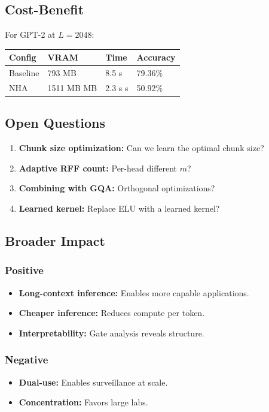 \subsection{Cost-Benefit}

For GPT-2 at $L = 2048$:

\begin{table}[H]
\centering
\small
\begin{tabular}{llll}
\toprule
\textbf{Config} & \textbf{VRAM} & \textbf{Time} & \textbf{Accuracy} \\
\midrule
Baseline & 793 MB & 8.5 s & 79.36\% \\
NHA & 1511 MB MB & 2.3 s s & 50.92\% \\
\bottomrule
\end{tabular}
\end{table}

\subsection{Open Questions}

\begin{enumerate}
\item \textbf{Chunk size optimization:} Can we learn the optimal chunk size?
\item \textbf{Adaptive RFF count:} Per-head different $m$?
\item \textbf{Combining with GQA:} Orthogonal optimizations?
\item \textbf{Learned kernel:} Replace ELU with a learned kernel?

\end{enumerate}
\subsection{Broader Impact}

\subsubsection{Positive}
\begin{itemize}
\item \textbf{Long-context inference:} Enables more capable applications.
\item \textbf{Cheaper inference:} Reduces compute per token.
\item \textbf{Interpretability:} Gate analysis reveals structure.

\end{itemize}
\subsubsection{Negative}
\begin{itemize}
\item \textbf{Dual-use:} Enables surveillance at scale.
\item \textbf{Concentration:} Favors large labs.

\end{itemize}
